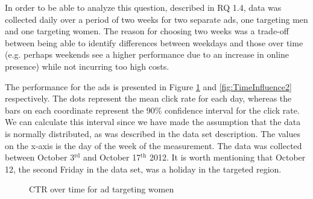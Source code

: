 \documentclass{sig-alternate}
\newcommand{\superscript}[1]{\ensuremath{^{\textrm{#1}}}}
\begin{document}
In order to be able to analyze this question, described in RQ 1.4, data was collected daily over a period of two weeks for two separate ads, one targeting men and one targeting women. The reason for choosing two weeks was a trade-off between being able to identify differences between weekdays and those over time (e.g. perhaps weekends see a higher performance due to an increase in online presence) while not incurring too high costs.

The performance for the ads is presented in Figure \ref{fig:TimeInfluence1} and \ref{fig:TimeInfluence2} respectively. The dots represent the mean click rate for each day, whereas the bars on each coordinate represent the 90\% confidence interval for the click rate. We can calculate this interval since we have made the assumption that the data is normally distributed, as was described in the data set description. The values on the x-axis is the day of the week of the measurement. The data was collected between October 3\superscript{rd} and October 17\superscript{th} 2012. It is worth mentioning that October 12, the second Friday in the data set, was a holiday in the targeted region.

\begin{figure}[htb]
\begin{center}

	\caption{CTR over time for ad targeting women}
	\label{fig:TimeInfluence1}
\end{center}
\end{figure}
\end{document}
